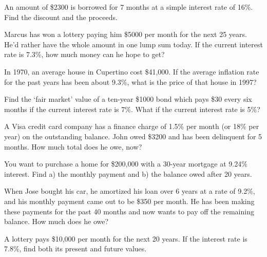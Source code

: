 \begin{puzzle}
    An amount of \$2300 is borrowed for 7 months at a simple interest rate of 16\%. Find the discount and the proceeds.
\end{puzzle}

\begin{puzzle}
    Marcus has won a lottery paying him \$5000 per month for the next 25 years. He’d rather have the whole amount in one lump sum today. If the current interest rate is 7.3\%, how much money can he hope to get?
\end{puzzle}

\begin{puzzle}
    In 1970, an average house in Cupertino cost \$41,000. If the average inflation rate for the past years has been about 9.3\%, what is the price of that house in 1997?
\end{puzzle}

\begin{puzzle}
    Find the ‘fair market’ value of a ten-year \$1000 bond which pays \$30 every six months if the current interest rate is 7\%. What if the current interest rate is 5\%?
\end{puzzle}

\begin{puzzle}
    A Visa credit card company has a finance charge of 1.5\% per month (or 18\% per year) on the outstanding balance. John owed \$3200 and has been delinquent for 5 months. How much total does he owe, now?
\end{puzzle}

\begin{puzzle}
    You want to purchase a home for \$200,000 with a 30-year mortgage at 9.24\% interest. Find a) the monthly payment and b) the balance owed after 20 years.
\end{puzzle}

\begin{puzzle}
    When Jose bought his car, he amortized his loan over 6 years at a rate of 9.2\%, and his monthly payment came out to be \$350 per month. He has been making these payments for the past 40 months and now wants to pay off the remaining balance. How much does he owe?
\end{puzzle}

\begin{puzzle}
    A lottery pays \$10,000 per month for the next 20 years. If the interest rate is 7.8\%, find both its present and future values.
\end{puzzle}

